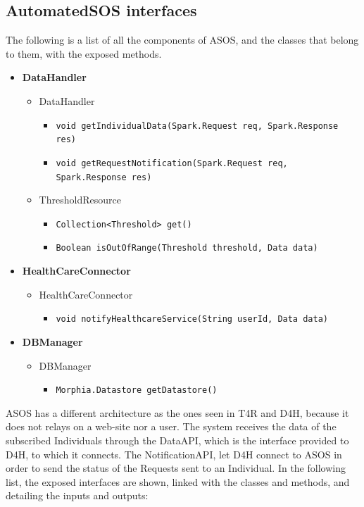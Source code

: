 \documentclass[a4paper, hidelinks, 12pt]{report}
\begin{document}
	\subsection{AutomatedSOS interfaces}
	The following is a list of all the components of ASOS, and the classes that belong to them, with the exposed methods.
	\begin{itemize}
		\item{\textbf{DataHandler}}
			\begin{itemize}
				\item{DataHandler}
					\begin{itemize}
						\item{\verb|void getIndividualData(Spark.Request req, Spark.Response res)|}
						\item{\verb|void getRequestNotification(Spark.Request req, Spark.Response res)|}
					\end{itemize}
					\item{ThresholdResource}
					\begin{itemize}
						\item{\verb|Collection<Threshold> get()|}
						\item{\verb|Boolean isOutOfRange(Threshold threshold, Data data)|}
					\end{itemize}
			\end{itemize}
		\item{\textbf{HealthCareConnector}}
			\begin{itemize}
				\item{HealthCareConnector}
					\begin{itemize}
						\item{\verb|void notifyHealthcareService(String userId, Data data)|}
					\end{itemize}
			\end{itemize}
		\item{\textbf{DBManager}}
			\begin{itemize}
				\item{DBManager}
					\begin{itemize}
						\item{\verb|Morphia.Datastore getDatastore()|}
					\end{itemize}
			\end{itemize}
	\end{itemize}
	ASOS has a different architecture as the ones seen in T4R and D4H, because it does not relays on a web-site nor a user. The system receives the data of the subscribed Individuals through the DataAPI, which is the interface provided to D4H, to which it connects. The NotificationAPI, let D4H connect to ASOS in order to send the status of the Requests sent to an Individual.  In the following list, the exposed interfaces are shown, linked with the classes and methods, and detailing the inputs and outputs:
	
\end{document}
